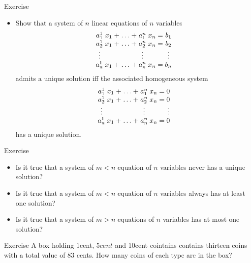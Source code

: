 \documentclass{beamer}
\begin{document}
\begin{frame}{Exercise}
  \begin{itemize}
  \item Show that a system of $n$ linear equations of $n$ variables
    \[
  \arraycolsep=1.4pt%
  \begin{array}{ccccccccc}
    a^1_1 & x_1 & + & \dots & + & a^n_1 & x_n & = & b_1 \\
    a^1_2 & x_1 & + & \dots & + & a^n_2 & x_n & = & b_2\\
    \vdots&     &   &      &  &\vdots&     &   & \vdots\\
    a^1_n & x_1 & + & \dots & + &  a^n_n & x_n & = & b_n\\
  \end{array}
  \]
  admits a unique solution iff the associated homogeneous system
  \[
  \arraycolsep=1.4pt%
  \begin{array}{ccccccccc}
    a^1_1 & x_1 & + & \dots & + & a^n_1 & x_n & = & 0 \\
    a^1_2 & x_1 & + & \dots & + & a^n_2 & x_n & = & 0\\
    \vdots&     &   &      &  &\vdots&     &   & \vdots\\
    a^1_n & x_1 & + & \dots & + &  a^n_n & x_n & = & 0\\
  \end{array}
  \]
  has a unique solution.
  \end{itemize}


\end{frame}


\begin{frame}{Exercise}
  \begin{itemize}
  \item Is it true that a system of $m < n$ equation of $n$ variables never has a unique solution?
  \item Is it true that a system of $m < n$ equation of $n$ variables always has at least one solution?
  \item Is it true that a system of $m > n$ equations of $n$ variables has at most one solution?
  \end{itemize} 
\end{frame}

\begin{frame}{Exercise}
  A box holding $1$cent, $5cent$ and $10$cent cointains contains thirteen coins with a total
  value of $83$ cents. How many coins of each type are in the box? 
\end{frame}
  
\end{document}
